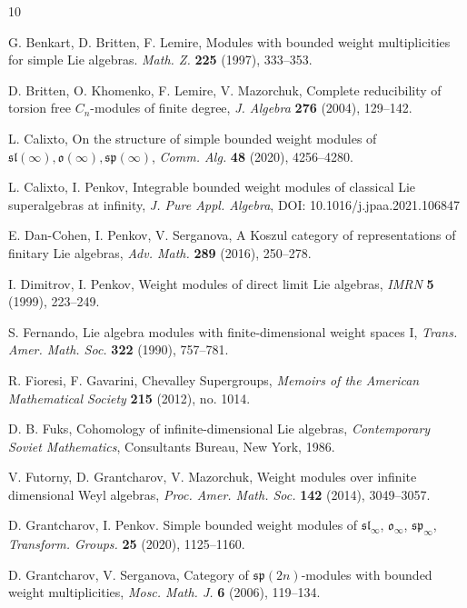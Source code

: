 \documentclass[12pt]{amsart}
\theoremstyle{plain} %
\numberwithin{equation}{section}
\theoremstyle{definition}
\theoremstyle{remark}
\theoremstyle{plain} %
\renewcommand{\sp}{\mathfrak{sp}}
\renewcommand{\sl}{\mathfrak{sl}}
\newcommand{\gs}{\mathfrak{s}}
\def\gp{\mathfrak{p}}
\def\gs{\mathfrak{s}}
\begin{document}
 
   \begin{thebibliography}{10}
   
    G. Benkart, D. Britten, F. Lemire,
Modules with bounded weight multiplicities for simple Lie
algebras. {\it Math. Z.} {\bf 225} (1997),  333--353.


   D. Britten, O. Khomenko, F. Lemire, V. Mazorchuk, Complete reducibility of torsion free $C_n$-modules of finite degree, {\it J. Algebra}  {\bf 276}  (2004), 129--142. 


	 L. Calixto, On the structure of simple bounded weight modules of $\sl(\infty), \mathfrak o (\infty ), \sp(\infty)$, \emph{Comm. Alg.}  \textbf{48} (2020), 4256--4280.


	 L. Calixto, I. Penkov,  Integrable bounded weight modules of classical Lie superalgebras at infinity,  \emph{J. Pure Appl. Algebra},  DOI: 10.1016/j.jpaa.2021.106847


 E. Dan-Cohen, I. Penkov, V. Serganova,  A Koszul category of representations of finitary Lie algebras, \emph{Adv. Math.} \textbf{289} (2016), 250--278.

 I. Dimitrov, I. Penkov,  Weight modules of direct limit Lie algebras, \emph{IMRN} \textbf{5} (1999), 223--249.

 S. Fernando, Lie algebra modules with finite-dimensional weight spaces I, {\it Trans. Amer. Math. Soc.}  {\bf 322} (1990), 757--781.
 
 R. Fioresi, F. Gavarini, Chevalley Supergroups,  \emph{Memoirs of the American Mathematical Society } {\bf 215} (2012), no. 1014.
	

 D. B. Fuks, Cohomology of infinite-dimensional Lie algebras,
{\it Contemporary Soviet Mathematics}, Consultants Bureau, New
York, 1986.

 V. Futorny, D. Grantcharov, V. Mazorchuk, Weight modules over infinite dimensional Weyl algebras, {\it Proc. Amer. Math. Soc.} {\bf 142} (2014), 3049--3057.

	
 D. Grantcharov, I. Penkov. Simple bounded weight modules of $\mathfrak{sl}_{\infty}$, $\mathfrak{o}_{\infty}$, $\mathfrak{sp}_{\infty}$, \emph{Transform. Groups.} \textbf{25} (2020), 1125--1160.
	
	

 D. Grantcharov, V. Serganova, {Category of $\gs \gp (2n)$-modules
with bounded weight multiplicities}, {\it Mosc. Math. J.} {\bf 6} (2006), 119--134. 


\end{thebibliography}
\end{document}
